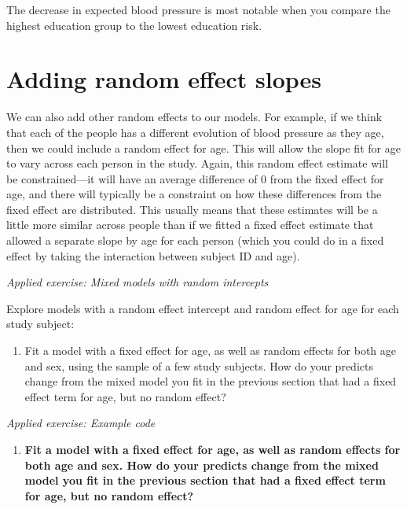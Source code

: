 \documentclass[
]{book}
\providecommand{\tightlist}{%
  \setlength{\itemsep}{0pt}\setlength{\parskip}{0pt}}
\begin{document}
The decrease in expected blood pressure is most notable when you compare the
highest education group to the lowest education risk.

\hypertarget{adding-random-effect-slopes}{%
\section{Adding random effect slopes}\label{adding-random-effect-slopes}}

We can also add other random effects to our models. For example, if we think that
each of the people has a different evolution of blood pressure as they age, then
we could include a random effect for age. This will allow the slope fit for
age to vary across each person in the study. Again, this random effect estimate
will be constrained---it will have an average difference of 0 from the fixed
effect for age, and there will typically be a constraint on how these differences
from the fixed effect are distributed. This usually means that these estimates
will be a little more similar across people than if we fitted a fixed effect
estimate that allowed a separate slope by age for each person (which you could
do in a fixed effect by taking the interaction between subject ID and age).

\emph{Applied exercise: Mixed models with random intercepts}

Explore models with a random effect intercept and random effect for age for each study subject:

\begin{enumerate}
\def\labelenumi{\arabic{enumi}.}
\tightlist
\item
  Fit a model with a fixed effect for age, as well as random effects for both
  age and sex, using the sample of a few study subjects. How do your predicts
  change from the mixed model you fit in the previous section that had a fixed
  effect term for age, but no random effect?
\end{enumerate}

\emph{Applied exercise: Example code}

\begin{enumerate}
\def\labelenumi{\arabic{enumi}.}
\tightlist
\item
  \textbf{Fit a model with a fixed effect for age, as well as random effects for both
  age and sex. How do your predicts change from the mixed model you fit in the
  previous section that had a fixed effect term for age, but no random effect?}
\end{enumerate}
\end{document}
